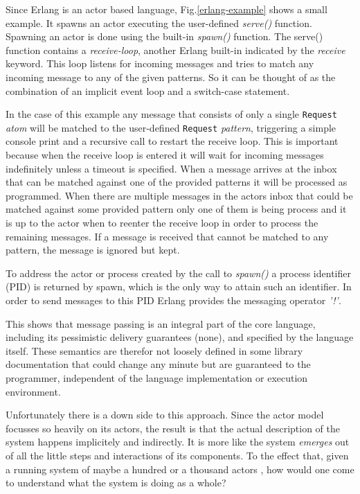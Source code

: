 Since Erlang is an actor based language, Fig.\ref{erlang-example}
shows a small example. It spawns an actor executing the
user-defined \textit{serve()} function. Spawning an actor is done
using the built-in \textit{spawn()} function. The serve() function
contains a \textit{receive-loop}, another Erlang built-in indicated
by the \textit{receive} keyword. This loop listens for incoming
messages and tries to match any incoming message to any of the
given patterns. So it can be thought of as the combination of an
implicit event loop and a switch-case statement.

In the case of this example any message that consists of only a single
\texttt{Request} \textit{atom} will be matched to the user-defined
\texttt{Request} \textit{pattern}, triggering
a simple console print and a recursive call to restart the receive
loop. This is important because when the receive loop is entered it
will wait for incoming messages indefinitely unless a timeout is
specified. When a message arrives at the inbox that can be matched
against one of the provided patterns it will be processed as
programmed. When there are multiple messages in the actors inbox
that could be matched against some provided pattern only one
of them is being process and it is up to the actor when to
reenter the receive loop in order to process the remaining messages.
If a message is received that cannot be matched to any pattern, the
message is ignored but kept.
\newline

To address the actor or process created by the call to \textit{spawn()}
a process identifier (PID) is returned by spawn, which is the only
way to attain such an identifier. In order to send messages to this
PID Erlang provides the messaging operator \textit{'!'}.

This shows that message passing is an integral part of the core
language, including its pessimistic delivery guarantees (none), and
specified by the language itself. These semantics are therefor
not loosely defined in some library documentation that could
change any minute but are guaranteed to the programmer,
independent of the language implementation or execution environment.
\newline

Unfortunately there is a down side to this approach. Since the
actor model focusses so heavily on its actors, the result is that
the actual description of the system happens implicitely and
indirectly. It is more like the system \textit{emerges} out of all the
little steps and interactions of its components. To the effect that,
given a running system of maybe a hundred or a thousand actors
\cite{uber}, how would one come to understand what the system is doing
as a whole?

